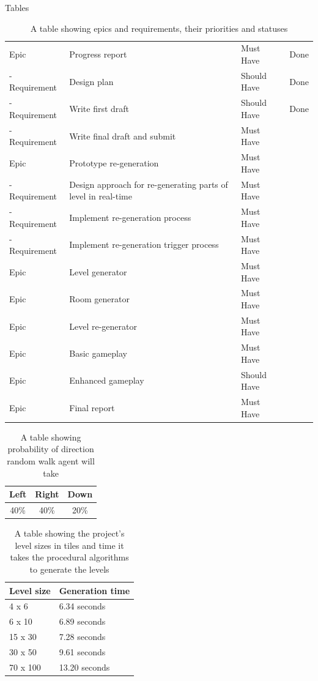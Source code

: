 \documentclass[progress]{cmpreport}
\begin{document}
\begin{section}{Tables}
\begin{table}[H]
{\begin{tabular}{llll}
    Epic & Progress report & Must Have & Done \\
    - Requirement & Design plan & Should Have & Done \\
    - Requirement & Write first draft & Should Have & Done \\
    - Requirement & Write final draft and submit & Must Have &  \\ \hline
    Epic & Prototype re-generation & Must Have &  \\
    - Requirement & Design approach for re-generating parts of level in real-time & Must Have &  \\
    - Requirement & Implement re-generation process & Must Have &  \\
    - Requirement & Implement re-generation trigger process & Must Have &  \\ \hline
    Epic & Level generator & Must Have &  \\ \hline
    Epic & Room generator & Must Have &  \\ \hline
    Epic & Level re-generator & Must Have &  \\ \hline
    Epic & Basic gameplay & Must Have &  \\ \hline
    Epic & Enhanced gameplay & Should Have &  \\ \hline
    Epic & Final report & Must Have &  \\ \hline
    \end{tabular}%
    }
    \caption{A table showing epics and requirements, their priorities and statuses}
    \label{tab:epicreqs}
\end{table}

\begin{table}[h!]
    \centering
    \begin{tabular}{ |c|c|c| }
    \hline
    \textbf{Left} & \textbf{Right} & \textbf{Down} \\ 
    \hline
    40\% & 40\% & 20\%\\ 
    \hline
    \end{tabular}
    \caption{A table showing probability of direction random walk agent will take}
    \label{tab:probdirs}
\end{table}

\begin{table}[]
    \centering
    \begin{tabular}{|l|l|}
    \hline
    \textbf{Level size} & \textbf{Generation time} \\ \hline
    4 x 6 & 6.34 seconds \\ \hline
    6 x 10 & 6.89 seconds \\ \hline
    15 x 30 & 7.28 seconds \\ \hline
    30 x 50 & 9.61 seconds \\ \hline
    70 x 100 & 13.20 seconds \\ \hline
    \end{tabular}
    \caption{A table showing the project's level sizes in tiles and time it takes the procedural algorithms to generate the levels}
    \label{tab:gentimes}
    \end{table}

\end{section}
\end{document}
